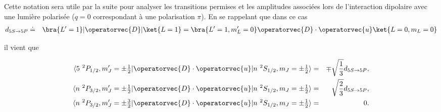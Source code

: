 Cette notation sera utile par la suite pour analyser les transitions permises et les amplitudes associées lors de l’interaction dipolaire avec une lumière polarisée ($q = 0$ correspondant à une polarisation $\pi$). En se rappelant que dans ce cas %
\begin{eqnarray*}
	d_{\scriptstyle 5S \rightarrow 5P} & \doteq &\bra{L'=1} \vert \operatorvec{D} \vert \ket{L=1} = \bra{L'=1 , m_L' =0 }  \operatorvec{D} \cdot \operatorvec{u} \ket{L=0 , m_L = 0 }	
\end{eqnarray*}

il vient que 

\begin{eqnarray*}
	\langle 5 {~}^2P_{1/2} , m_J' = \pm\tfrac12 \vert \operatorvec{D} \cdot \operatorvec{u}\vert n {~}^2S_{1/2} , m_J = \pm  \tfrac12 \rangle	 &=& \mp  \sqrt{\frac{1}{3}} d_{\scriptstyle 5S \rightarrow 5P},\\
	\langle n {~}^2P_{3/2} , m_J' = \pm \tfrac12 \vert \operatorvec{D} \cdot \operatorvec{u}\vert n {~}^2S_{1/2} , m_J = \pm  \tfrac12 \rangle	 &=& \sqrt{\frac{2}{3}} d_{\scriptstyle 5S \rightarrow 5P} , \\
	\langle n {~}^2P_{3/2} , m_J' = \pm \tfrac32 \vert \operatorvec{D} \cdot \operatorvec{u}\vert n {~}^2S_{1/2} , m_J = \pm  \tfrac12 \rangle & = & 0 .
\end{eqnarray*}






